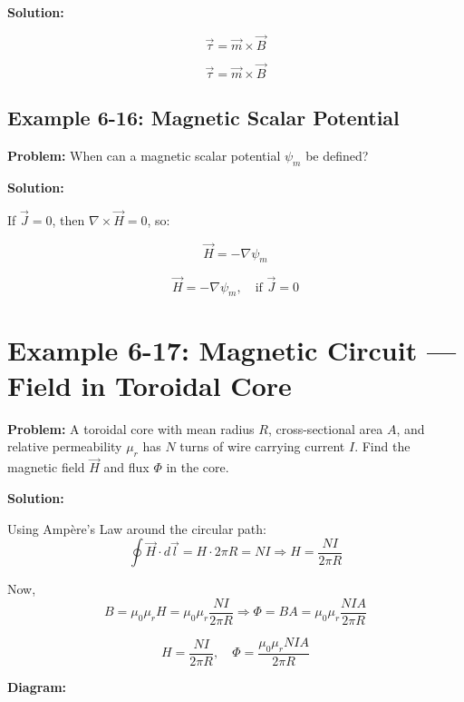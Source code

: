 \documentclass[12pt]{article}
\begin{document}
\textbf{Solution:}

\[
\vec{\tau} = \vec{m} \times \vec{B}
\]

\begin{tcolorbox}
\[
\boxed{\vec{\tau} = \vec{m} \times \vec{B}}
\]
\end{tcolorbox}

\subsection*{Example 6-16: Magnetic Scalar Potential}

\textbf{Problem:}  
When can a magnetic scalar potential \( \psi_m \) be defined?

\textbf{Solution:}

If \( \vec{J} = 0 \), then \( \nabla \times \vec{H} = 0 \), so:

\[
\vec{H} = -\nabla \psi_m
\]

\begin{tcolorbox}
\[
\boxed{\vec{H} = -\nabla \psi_m}, \quad \text{if } \vec{J} = 0
\]
\end{tcolorbox}



\section*{Example 6-17: Magnetic Circuit — Field in Toroidal Core}

\textbf{Problem:}  
A toroidal core with mean radius \( R \), cross-sectional area \( A \), and relative permeability \( \mu_r \) has \( N \) turns of wire carrying current \( I \). Find the magnetic field \( \vec{H} \) and flux \( \Phi \) in the core.

\textbf{Solution:}

Using Ampère’s Law around the circular path:
\[
\oint \vec{H} \cdot d\vec{l} = H \cdot 2\pi R = N I
\Rightarrow H = \frac{N I}{2\pi R}
\]

Now,
\[
B = \mu_0 \mu_r H = \mu_0 \mu_r \frac{N I}{2\pi R}
\Rightarrow \Phi = B A = \mu_0 \mu_r \frac{N I A}{2\pi R}
\]

\begin{tcolorbox}
\[
\boxed{H = \frac{N I}{2\pi R}}, \quad
\boxed{\Phi = \frac{\mu_0 \mu_r N I A}{2\pi R}}
\]
\end{tcolorbox}

\textbf{Diagram:}
\begin{center}
\end{center}
\end{document}
